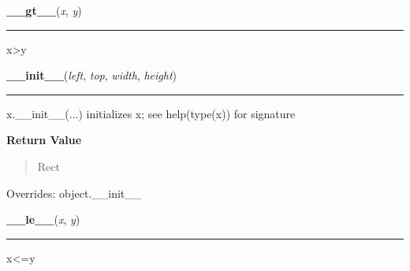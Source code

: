     \label{pygame:Rect:__gt__}

    \vspace{0.5ex}

\hspace{.8\funcindent}\begin{boxedminipage}{\funcwidth}

    \raggedright \textbf{\_\_gt\_\_}(\textit{x}, \textit{y})

    \vspace{-1.5ex}

    \rule{\textwidth}{0.5\fboxrule}
\setlength{\parskip}{2ex}
    x{\textgreater}y

\setlength{\parskip}{1ex}
    \end{boxedminipage}

    \vspace{0.5ex}

\hspace{.8\funcindent}\begin{boxedminipage}{\funcwidth}

    \raggedright \textbf{\_\_init\_\_}(\textit{left}, \textit{top}, \textit{width}, \textit{height})

    \vspace{-1.5ex}

    \rule{\textwidth}{0.5\fboxrule}
\setlength{\parskip}{2ex}
    x.\_\_init\_\_(...) initializes x; see help(type(x)) for signature

\setlength{\parskip}{1ex}
      \textbf{Return Value}
    \vspace{-1ex}

      \begin{quote}
      Rect

      \end{quote}

      Overrides: object.\_\_init\_\_

    \end{boxedminipage}

    \label{pygame:Rect:__le__}

    \vspace{0.5ex}

\hspace{.8\funcindent}\begin{boxedminipage}{\funcwidth}

    \raggedright \textbf{\_\_le\_\_}(\textit{x}, \textit{y})

    \vspace{-1.5ex}

    \rule{\textwidth}{0.5\fboxrule}
\setlength{\parskip}{2ex}
    x{\textless}=y

\setlength{\parskip}{1ex}
    \end{boxedminipage}


